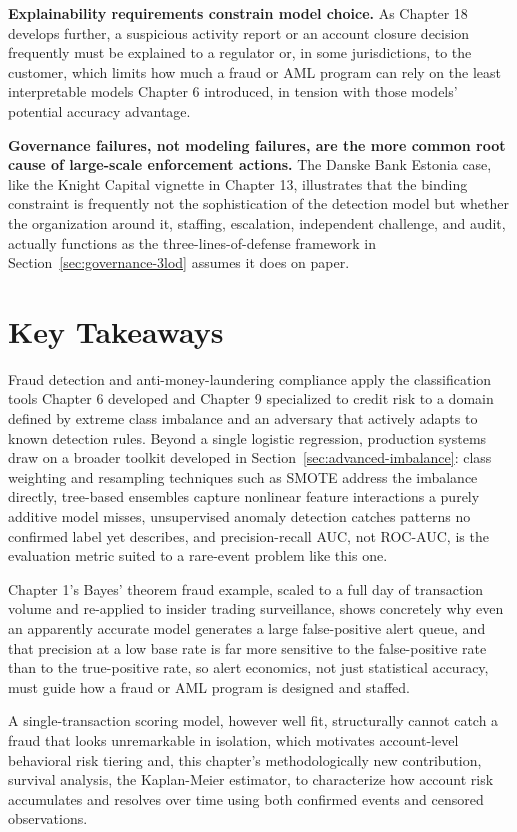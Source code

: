 \documentclass[../ai_in_finance]{subfiles}
\begin{document}
\textbf{Explainability requirements constrain model choice.} As Chapter 18 develops further, a suspicious activity report or an account closure decision frequently must be explained to a regulator or, in some jurisdictions, to the customer, which limits how much a fraud or AML program can rely on the least interpretable models Chapter 6 introduced, in tension with those models' potential accuracy advantage.

\textbf{Governance failures, not modeling failures, are the more common root cause of large-scale enforcement actions.} The Danske Bank Estonia case, like the Knight Capital vignette in Chapter 13, illustrates that the binding constraint is frequently not the sophistication of the detection model but whether the organization around it, staffing, escalation, independent challenge, and audit, actually functions as the three-lines-of-defense framework in Section~\ref{sec:governance-3lod} assumes it does on paper.

\section{Key Takeaways}

Fraud detection and anti-money-laundering compliance apply the classification tools Chapter 6 developed and Chapter 9 specialized to credit risk to a domain defined by extreme class imbalance and an adversary that actively adapts to known detection rules. Beyond a single logistic regression, production systems draw on a broader toolkit developed in Section~\ref{sec:advanced-imbalance}: class weighting and resampling techniques such as SMOTE address the imbalance directly, tree-based ensembles capture nonlinear feature interactions a purely additive model misses, unsupervised anomaly detection catches patterns no confirmed label yet describes, and precision-recall AUC, not ROC-AUC, is the evaluation metric suited to a rare-event problem like this one.

Chapter 1's Bayes' theorem fraud example, scaled to a full day of transaction volume and re-applied to insider trading surveillance, shows concretely why even an apparently accurate model generates a large false-positive alert queue, and that precision at a low base rate is far more sensitive to the false-positive rate than to the true-positive rate, so alert economics, not just statistical accuracy, must guide how a fraud or AML program is designed and staffed.

A single-transaction scoring model, however well fit, structurally cannot catch a fraud that looks unremarkable in isolation, which motivates account-level behavioral risk tiering and, this chapter's methodologically new contribution, survival analysis, the Kaplan-Meier estimator, to characterize how account risk accumulates and resolves over time using both confirmed events and censored observations.
\end{document}
